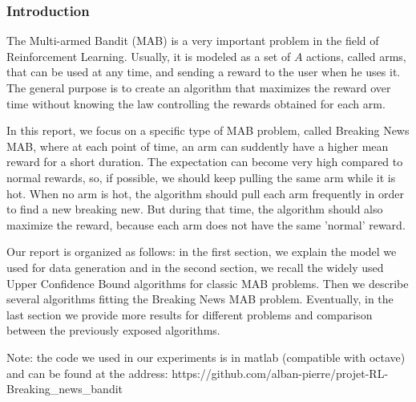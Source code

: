 \documentclass[french]{beamer}
\begin{document}
	\begin{frame}
	\frametitle{Introduction}
	
	The Multi-armed Bandit (MAB) is a very important problem in the field of Reinforcement Learning.
	Usually, it is modeled as a set of $A$ actions, called arms, that can be used at any time,
	and sending a reward to the user when he uses it. The general purpose is to create an algorithm that
	maximizes the reward over time without knowing the law controlling the rewards obtained
	for each arm.
	
	In this report, we focus on a specific type of MAB problem, called Breaking News MAB,
	where at each point of time, an arm can suddently have a higher mean reward for a short duration. The expectation can become
	very high compared to normal rewards, so, if possible, we should keep pulling the same
	arm while it is hot. When no arm is hot, the algorithm should pull each arm frequently
	in order to find a new breaking new. But during that time, the algorithm should
	also maximize the reward, because each arm does not have the same 'normal' reward.
	
	Our report is organized as follows: in the first
	section, we explain the model we used for data generation and in the second section, we recall the widely used
	Upper Confidence Bound algorithms for classic MAB problems. Then we describe
	several algorithms fitting the Breaking News MAB problem.
	Eventually, in the last section we provide more results for different problems and comparison between
	the previously exposed algorithms.
	\newline
	
	Note: the code we used in our experiments is in matlab (compatible with octave) and can be found at the address: https://github.com/alban-pierre/projet-RL-Breaking\_news\_bandit
	
	\end{frame}
\end{document}
